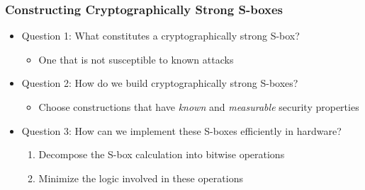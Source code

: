 \documentclass[10pt]{beamer}
\begin{document}
\begin{frame}
	\frametitle{Constructing Cryptographically Strong S-boxes}
	\begin{itemize}
		\item Question 1: What constitutes a cryptographically strong S-box?
		\pause
		\medskip
		\begin{itemize}
			\item One that is not susceptible to known attacks
		\end{itemize}
		\pause
		\medskip
		\item Question 2: How do we build cryptographically strong S-boxes?
		\pause
		\medskip
		\begin{itemize}
			\item Choose constructions that have \emph{known} and \emph{measurable} security properties
		\end{itemize}
		\pause
		\medskip
		\item Question 3: How can we implement these S-boxes efficiently in hardware?
		\pause
		\medskip
		\begin{enumerate}
			\item Decompose the S-box calculation into bitwise operations
			\item Minimize the logic involved in these operations
		\end{enumerate}
	\end{itemize}
\end{frame}


\end{document}
